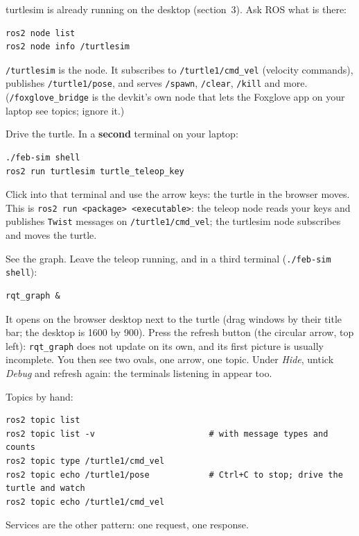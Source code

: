 \documentclass[11pt,a4paper]{article}
\begin{document}
turtlesim is already running on the desktop (section~3). Ask ROS what is there:

\begin{lstlisting}
ros2 node list
ros2 node info /turtlesim
\end{lstlisting}

\texttt{/turtlesim} is the node. It subscribes to \texttt{/turtle1/cmd\_vel} (velocity
commands), publishes \texttt{/turtle1/pose}, and serves \texttt{/spawn}, \texttt{/clear},
\texttt{/kill} and more. (\texttt{/foxglove\_bridge} is the devkit's own node that lets the
Foxglove app on your laptop see topics; ignore it.)

Drive the turtle. In a \textbf{second} terminal on your laptop:

\begin{lstlisting}
./feb-sim shell
ros2 run turtlesim turtle_teleop_key
\end{lstlisting}

Click into that terminal and use the arrow keys: the turtle in the browser moves. This is
\texttt{ros2 run <package> <executable>}: the teleop node reads your keys and publishes
\texttt{Twist} messages on \texttt{/turtle1/cmd\_vel}; the turtlesim node subscribes and moves
the turtle.

See the graph. Leave the teleop running, and in a third terminal (\texttt{./feb-sim shell}):

\begin{lstlisting}
rqt_graph &
\end{lstlisting}

It opens on the browser desktop next to the turtle (drag windows by their title bar; the
desktop is 1600 by 900). Press the refresh button (the circular arrow, top left):
\texttt{rqt\_graph} does not update on its own, and its first picture is usually incomplete.
You then see two ovals, one arrow, one topic. Under \emph{Hide}, untick \emph{Debug} and
refresh again: the terminals listening in appear too.

Topics by hand:

\begin{lstlisting}
ros2 topic list
ros2 topic list -v                       # with message types and counts
ros2 topic type /turtle1/cmd_vel
ros2 topic echo /turtle1/pose            # Ctrl+C to stop; drive the turtle and watch
ros2 topic echo /turtle1/cmd_vel
\end{lstlisting}

Services are the other pattern: one request, one response.
\end{document}

